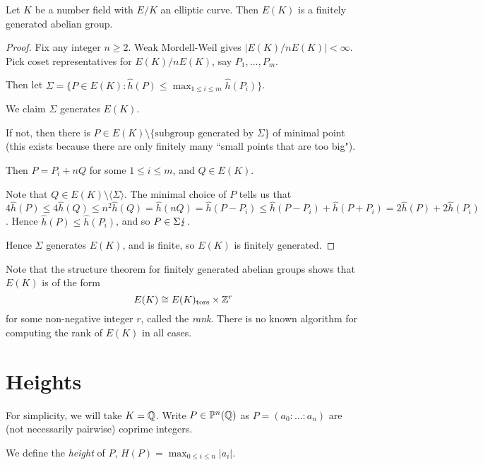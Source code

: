 \documentclass[10pt,a4paper]{article}
\begin{document}
\begin{theorem}
  Let $K$ be a number field with $E/K$ an elliptic curve. Then $E(K)$ is a finitely generated abelian group.
\end{theorem}
\begin{proof}
  Fix any integer $n \geq 2$. Weak Mordell-Weil gives $|E(K)/nE(K)| < \infty$. Pick coset representatives for $E(K)/nE(K)$, say $P_1, \ldots, P_m$.

  Then let $\Sigma = \{P \in E(K) : \hat{h}(P) \leq \max_{1 \leq i \leq m} \hat{h}(P_i)\}$.

  We claim $\Sigma$ generates $E(K)$.

  If not, then there is $P \in E(K) \setminus \{\text{subgroup generated by }\Sigma\}$ of minimal point (this exists because there are only finitely many ``small points that are too big").

  Then $P = P_i + nQ$ for some $1 \leq i \leq m$, and $Q \in E(K)$.

  Note that $Q \in E(K) \setminus \langle\Sigma\rangle$. The minimal choice of $P$ tells us that $4\hat{h}(P) \leq 4\hat{h}(Q) \leq n^2 \hat{h}(Q) = \hat{h}(nQ) = \hat{h}(P-P_i) \leq \hat{h}(P-P_i) + \hat{h}(P+P_i) = 2\hat{h}(P) + 2\hat{h}(P_i)$. Hence $\hat{h}(P) \leq \hat{h}(P_i)$, and so $P \in \Sigma \lightning$.

  Hence $\Sigma$ generates $E(K)$, and is finite, so $E(K)$ is finitely generated.
\end{proof}
Note that the structure theorem for finitely generated abelian groups shows that $E(K)$ is of the form
\[E(K) \cong E(K)_\text{tors} \times \mathbb{Z}^r\]
for some non-negative integer $r$, called the \emph{rank}. There is no known algorithm for computing the rank of $E(K)$ in all cases.

\section{Heights}
For simplicity, we will take $K = \mathbb{Q}$. Write $P \in \mathbb{P}^n(\mathbb{Q})$ as $P = (a_0:\ldots:a_n)$ are (not necessarily pairwise) coprime integers.

We define the \emph{height} of $P$, $H(P) = \max_{0 \leq i \leq n}|a_i|$.
\end{document}
